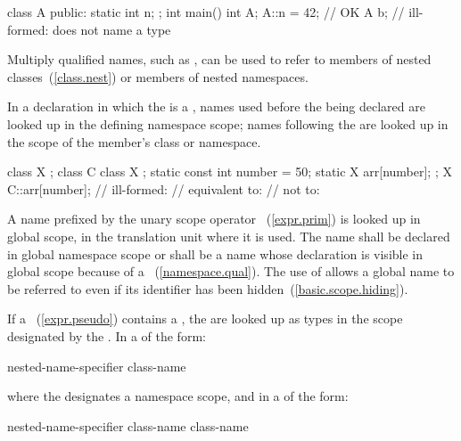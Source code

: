 \begin{codeblock}
class A {
public:
	static int n;
};
int main()
{
	int A;
	A::n = 42;		// OK
	A b;			// ill-formed:  does not name a type
}
\end{codeblock}
\exitexampleb

\pnum
\enternote Multiply qualified names, such as , can
be used to refer to members of nested classes~(\ref{class.nest}) or
members of nested namespaces. \exitnote

\pnum
In a declaration in which the  is a
, names used before the 
being declared are looked up in the defining namespace scope; names
following the  are looked up in the scope of the
member's class or namespace. \enterexample

\begin{codeblock}
class X { };
class C {
	class X { };
	static const int number = 50;
	static X arr[number];
};
X C::arr[number];		// ill-formed:
				// equivalent to:  
				// not to:  
\end{codeblock}
\exitexampleb

\pnum
{}%
A name prefixed by the unary scope operator \tcode{::}~(\ref{expr.prim})
is looked up in global scope, in the translation unit where it is used.
The name shall be declared in global namespace scope or shall be a name
whose declaration is visible in global scope because of a
~(\ref{namespace.qual}). The use of \tcode{::}
allows a global name to be referred to even if its identifier has been
hidden~(\ref{basic.scope.hiding}).

\pnum
If a ~(\ref{expr.pseudo}) contains a
, the  are looked
up as types in the scope designated by the
. In a
 of the form:

\begin{ncbnf}
\terminal{::}\opt nested-name-specifier \terminal{\tilde} class-name
\end{ncbnf}

where the  designates a namespace scope,
and in a  of the form:

\begin{ncbnf}
\terminal{::}\opt nested-name-specifier class-name \terminal{::} \terminal{\tilde} class-name
\end{ncbnf}

